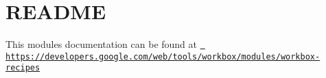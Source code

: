 \chapter{README}
\hypertarget{md_node__modules_2workbox-recipes_2README}{}\label{md_node__modules_2workbox-recipes_2README}
This module\textquotesingle{}s documentation can be found at \href{https://developers.google.com/web/tools/workbox/modules/workbox-recipes}{\texttt{ https\+://developers.\+google.\+com/web/tools/workbox/modules/workbox-\/recipes}} 